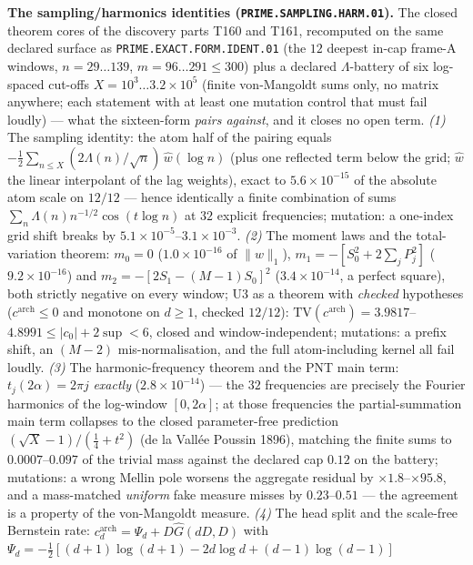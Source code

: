 \documentclass[11pt,a4paper]{article}
\begin{document}
\par\smallskip\noindent\textbf{The sampling/harmonics identities
(\texttt{PRIME.SAMPLING.HARM.01}).}
The closed theorem cores of the discovery parts T160 and T161,
recomputed on the same declared surface as
\texttt{PRIME.EXACT.FORM.IDENT.01} (the $12$ deepest in-cap frame-A
windows, $n=29\ldots139$, $m=96\ldots291\le300$) plus a declared
$\Lambda$-battery of six log-spaced cut-offs
$X=10^{3}\ldots3.2\times10^{5}$ (finite von-Mangoldt sums only, no
matrix anywhere; each statement with at least one mutation control that
must fail loudly) --- what the sixteen-form \emph{pairs against}, and it
closes no open term. \emph{(1)} The sampling identity: the atom half of
the pairing equals $-\tfrac12\sum_{n\le X}(2\Lambda(n)/\sqrt n)\,
\widehat w(\log n)$ (plus one reflected term below the grid;
$\widehat w$ the linear interpolant of the lag weights), exact to
$5.6\times10^{-15}$ of the absolute atom scale on $12/12$ --- hence
identically a finite combination of sums
$\sum_n\Lambda(n)n^{-1/2}\cos(t\log n)$ at $32$ explicit frequencies;
mutation: a one-index grid shift breaks by
$5.1\times10^{-5}$--$3.1\times10^{-3}$. \emph{(2)} The moment laws and
the total-variation theorem: $m_0=0$ ($1.0\times10^{-16}$ of
$\|w\|_1$), $m_1=-[S_0^2+2\sum_jP_j^2]$ ($9.2\times10^{-16}$) and
$m_2=-[2S_1-(M{-}1)S_0]^2$ ($3.4\times10^{-14}$, a perfect square),
both strictly negative on every window; U3 as a theorem with
\emph{checked} hypotheses ($c^{\mathrm{arch}}\le0$ and monotone on
$d\ge1$, checked $12/12$): $\mathrm{TV}(c^{\mathrm{arch}})=
3.9817$--$4.8991\le|c_0|+2\sup<6$, closed and window-independent;
mutations: a prefix shift, an $(M{-}2)$ mis-normalisation, and the full
atom-including kernel all fail loudly. \emph{(3)} The
harmonic-frequency theorem and the PNT main term:
$t_j(2\alpha)=2\pi j$ \emph{exactly} ($2.8\times10^{-14}$) --- the $32$
frequencies are precisely the Fourier harmonics of the log-window
$[0,2\alpha]$; at those frequencies the partial-summation main term
collapses to the closed parameter-free prediction
$(\sqrt X-1)/(\tfrac14+t^2)$ (de la Vall\'ee Poussin 1896), matching
the finite sums to $0.0007$--$0.097$ of the trivial mass against the
declared cap $0.12$ on the battery; mutations: a wrong Mellin pole
worsens the aggregate residual by $\times1.8$--$\times95.8$, and a
mass-matched \emph{uniform} fake measure misses by $0.23$--$0.51$ ---
the agreement is a property of the von-Mangoldt measure. \emph{(4)} The
head split and the scale-free Bernstein rate:
$c^{\mathrm{arch}}_d=\Psi_d+D\widehat G(dD,D)$ with
$\Psi_d=-\tfrac12[(d{+}1)\log(d{+}1)-2d\log d+(d{-}1)\log(d{-}1)]$
\end{document}
